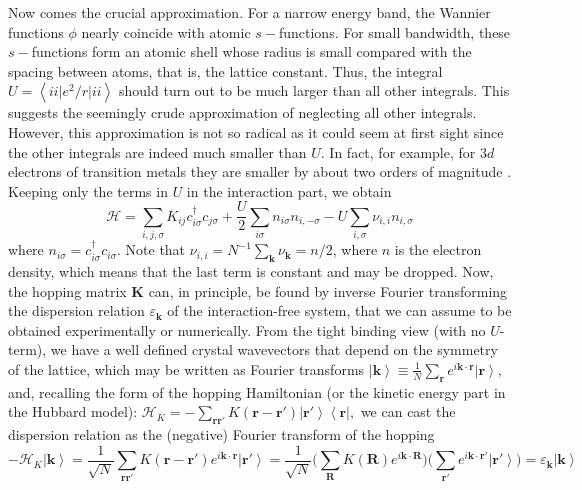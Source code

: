 Now comes the crucial approximation.
For a narrow energy band, the Wannier functions $\phi$ nearly coincide with atomic $s-$functions.
For small bandwidth, these $s-$functions form an atomic shell whose radius is small compared with the spacing between atoms, that is, the lattice constant.
Thus, the integral $U = \left\langle i i \big| e^2 / r \big| i i \right\rangle$ should turn out to be much larger than all other integrals.
This suggests the seemingly crude approximation of neglecting all other integrals.
However, this approximation is not so radical as it could seem at first sight since the other integrals are indeed much smaller than $U$.
In fact, for example, for $3d$ electrons of transition metals they are smaller by about two orders of magnitude \cite{hubbard_electron_1963}.
Keeping only the terms in $U$ in the interaction part, we obtain
\begin{equation}
\mathcal{H} = \sum_{i, j, \sigma} K_{ij} c_{i\sigma}^\dagger c_{j\sigma} + \frac{U}{2} \sum_{i\sigma} n_{i\sigma} n_{i, -\sigma} - U \sum_{i, \sigma} \nu_{i, i} n_{i, \sigma}
\end{equation}
where $n_{i\sigma} = c_{i\sigma}^\dagger c_{i\sigma}$.
Note that $\nu_{i, i} = N^{-1} \sum_{\bm k} \nu_{\bm k} = n/2$, where $n$ is the electron density, which means that the last term is constant and may be dropped.
Now, the hopping matrix $\bm K$ can, in principle, be found by inverse Fourier transforming the dispersion relation $\varepsilon_{\bm k}$ of the interaction-free system, that we can assume to be obtained experimentally or numerically.
From the tight binding view (with no $U$-term), we have a well defined crystal wavevectors that depend on the symmetry of the lattice, which may be written as Fourier transforms
$
\left| \bm k \right\rangle \equiv \frac{1}{N} \sum_{\bm r} e^{i\bm k \cdot \bm r} \left| \bm r \right\rangle , 
$
and, recalling the form of the hopping Hamiltonian (or the kinetic energy part in the Hubbard model):
$
\mathcal{H}_{K} = - \sum_{\bm r \bm r'} K (\bm r - \bm r') \left| \bm r' \right\rangle \left\langle \bm r \right| ,
$
 we can cast the dispersion relation as the (negative) Fourier transform of the hopping
\begin{equation}
- \mathcal{H}_{K} \left| \bm k \right\rangle = \frac{1}{\sqrt{N}} \sum_{\bm r \bm r'} K ( \bm r - \bm r' ) e^{i \bm k \cdot \bm r} \left| \bm r' \right \rangle = \frac{1}{\sqrt{N}} \bigg( \sum_{\bm R} K(\bm R) e^{i\bm k \cdot \bm R} \bigg)\bigg( \sum_{\bm r'} e^{i\bm k \cdot \bm r'} \left| \bm r' \right\rangle \bigg) = \varepsilon_{\bm k} \left| \bm k \right\rangle
\end{equation}

